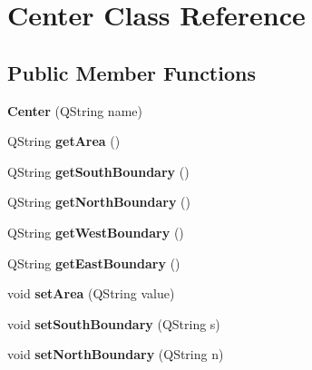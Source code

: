 \hypertarget{class_center}{}\section{Center Class Reference}
\label{class_center}
\subsection*{Public Member Functions}
\begin{DoxyCompactItemize}
\item 
{\bfseries Center} (Q\+String name)\hypertarget{class_center_aa9cce441a9ac92e67bd957af94f3836f}{}\label{class_center_aa9cce441a9ac92e67bd957af94f3836f}

\item 
Q\+String {\bfseries get\+Area} ()\hypertarget{class_center_ac2b26e1ae67cc22cd2077c8b895cf132}{}\label{class_center_ac2b26e1ae67cc22cd2077c8b895cf132}

\item 
Q\+String {\bfseries get\+South\+Boundary} ()\hypertarget{class_center_a61d8edb5d5a9b4100e6b5e3ed53ceed5}{}\label{class_center_a61d8edb5d5a9b4100e6b5e3ed53ceed5}

\item 
Q\+String {\bfseries get\+North\+Boundary} ()\hypertarget{class_center_a501b1cb19923037782e36c973b6fb582}{}\label{class_center_a501b1cb19923037782e36c973b6fb582}

\item 
Q\+String {\bfseries get\+West\+Boundary} ()\hypertarget{class_center_a3cd74f7943e6d8bf1a2724496292a985}{}\label{class_center_a3cd74f7943e6d8bf1a2724496292a985}

\item 
Q\+String {\bfseries get\+East\+Boundary} ()\hypertarget{class_center_a03da519bedb55583269a378d05e63550}{}\label{class_center_a03da519bedb55583269a378d05e63550}

\item 
void {\bfseries set\+Area} (Q\+String value)\hypertarget{class_center_a883998adf0797e31586b3f31f9951b65}{}\label{class_center_a883998adf0797e31586b3f31f9951b65}

\item 
void {\bfseries set\+South\+Boundary} (Q\+String s)\hypertarget{class_center_a23a2167660e69020b6dc6b9da834dc8a}{}\label{class_center_a23a2167660e69020b6dc6b9da834dc8a}

\item 
void {\bfseries set\+North\+Boundary} (Q\+String n)\hypertarget{class_center_aa73c1df32c9ada2775823f3e5be37674}{}\label{class_center_aa73c1df32c9ada2775823f3e5be37674}


\end{DoxyCompactItemize}
